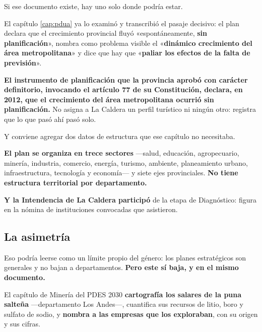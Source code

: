 Si ese documento existe, hay uno solo donde podría estar.

El capítulo \ref{cap:pdua} ya lo examinó y transcribió el pasaje decisivo: el plan declara que
el crecimiento provincial fluyó «espontáneamente, \textbf{sin planificación}», nombra como
problema visible el «\textbf{dinámico crecimiento del área metropolitana}» y dice que hay que
«\textbf{paliar los efectos de la falta de previsión}».

\textbf{El instrumento de planificación que la provincia aprobó con carácter definitorio, invocando el artículo 77 de su Constitución, declara, en
2012, que el crecimiento del área metropolitana ocurrió sin planificación.} No asigna a La
Caldera un perfil turístico ni ningún otro: registra que lo que pasó ahí pasó solo.

Y conviene agregar dos datos de estructura que ese capítulo no necesitaba.

\textbf{El plan se organiza en trece sectores} ---salud, educación, agropecuario, minería,
industria, comercio, energía, turismo, ambiente, planeamiento urbano, infraestructura,
tecnología y economía--- y siete ejes provinciales. \textbf{No tiene estructura territorial por
departamento.}

\textbf{Y la Intendencia de La Caldera participó} de la etapa de Diagnóstico: figura en la
nómina de instituciones convocadas que asistieron.

\subsection*{La asimetría}

Eso podría leerse como un límite propio del género: los planes estratégicos son generales y no
bajan a departamentos. \textbf{Pero este sí baja, y en el mismo documento.}

El capítulo de Minería del PDES 2030 \textbf{cartografía los salares de la puna salteña}
---departamento Los Andes---, cuantifica sus recursos de litio, boro y sulfato de sodio, y
\textbf{nombra a las empresas que los exploraban}, con su origen y sus cifras.

